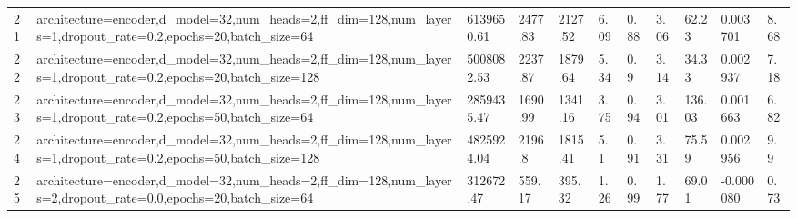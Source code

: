 \begin{longtable}{C{0.8cm} L{2cm} C{1.15cm} C{1.15cm} C{1.15cm} C{1.15cm} C{0.85cm} C{1.25cm} C{1.2cm} C{1.5cm} C{1.0cm}}
21 & architecture=encoder,\newline d\_model=32,\newline num\_heads=2,\newline ff\_dim=128,\newline num\_layers=1,\newline dropout\_rate=0.2,\newline epochs=20,\newline batch\_size=64 & 6139650.61 & 2477.83 & 2127.52 & 6.09 & 0.88 & 3.06 & 62.23 & 0.003701 & 8.68 \\
22 & architecture=encoder,\newline d\_model=32,\newline num\_heads=2,\newline ff\_dim=128,\newline num\_layers=1,\newline dropout\_rate=0.2,\newline epochs=20,\newline batch\_size=128 & 5008082.53 & 2237.87 & 1879.64 & 5.34 & 0.9 & 3.14 & 34.33 & 0.002937 & 7.18 \\
23 & architecture=encoder,\newline d\_model=32,\newline num\_heads=2,\newline ff\_dim=128,\newline num\_layers=1,\newline dropout\_rate=0.2,\newline epochs=50,\newline batch\_size=64 & 2859435.47 & 1690.99 & 1341.16 & 3.75 & 0.94 & 3.01 & 136.03 & 0.001663 & 6.82 \\
24 & architecture=encoder,\newline d\_model=32,\newline num\_heads=2,\newline ff\_dim=128,\newline num\_layers=1,\newline dropout\_rate=0.2,\newline epochs=50,\newline batch\_size=128 & 4825924.04 & 2196.8 & 1815.41 & 5.1 & 0.91 & 3.31 & 75.59 & 0.002956 & 9.9 \\
25 & architecture=encoder,\newline d\_model=32,\newline num\_heads=2,\newline ff\_dim=128,\newline num\_layers=2,\newline dropout\_rate=0.0,\newline epochs=20,\newline batch\_size=64 & 312672.47 & 559.17 & 395.32 & 1.26 & 0.99 & 1.77 & 69.01 & -0.000080 & 0.73 \\

\end{longtable}
